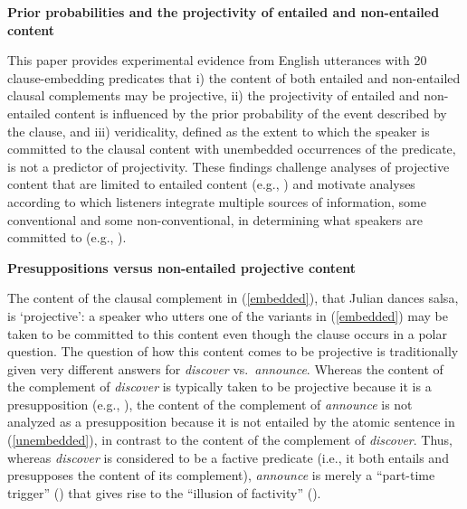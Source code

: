 \documentclass[12pt,fleqn]{article}
\newcommand{\6}{\mbox{$[\hspace*{-.6mm}[$}}
\newcommand{\9}{\mbox{$]\hspace*{-.6mm}]$}}
\begin{document}
 
 
\begin{center}
{\large \bf Prior probabilities and the projectivity of entailed and non-entailed content}
\end{center}

This paper provides experimental evidence from English utterances with 20 clause-embedding predicates that i) the content of both entailed and non-entailed clausal complements may be projective, ii) the projectivity of entailed and non-entailed content is influenced by the prior probability of the event described by the clause, and iii) veridicality, defined as the extent to which the speaker is committed to the clausal content with unembedded occurrences of the predicate, is not a predictor of projectivity. These findings challenge analyses of projective content that are limited to entailed content (e.g., \citealt{heim83,vds92}) and motivate analyses according to which listeners integrate multiple sources of information, some conventional and some non-conventional, in determining what speakers are committed to (e.g., \citealt{brst-salt10,brst-ar,abrusan2011,abrusan2016,tbd-variability}). 

{\bf Presuppositions versus non-entailed projective content} 

The content of the clausal complement in (\ref{embedded}), that Julian dances salsa, is `projective': a speaker who utters one of the variants in (\ref{embedded}) may be taken to be committed to this content even though the clause occurs in a polar question. The question of how this content comes to be projective is traditionally given very different answers for {\em discover} vs.\ {\em announce}. Whereas the content of the complement of {\em discover} is typically taken to be projective because it is a presupposition (e.g., \citealt{heim83,vds92}), the content of the complement of {\em announce} is not analyzed as a presupposition because it is not entailed by the atomic sentence in (\ref{unembedded}), in contrast to the content of the complement of {\em discover}. Thus, whereas {\em discover} is considered to be a factive predicate (i.e., it both entails and presupposes the content of its complement), {\em announce} is merely a ``part-time trigger'' (\citealt[139]{schlenker10}) that gives rise to the ``illusion of factivity'' (\citealt[76]{anand-hacquard2014}).
\end{document}
